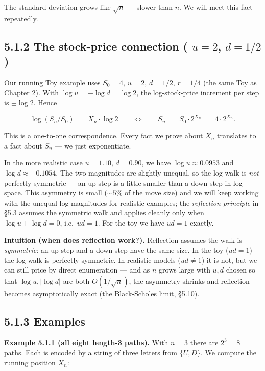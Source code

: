 \documentclass[
  10pt,
  twoside]{book}
\begin{document}
The standard deviation grows like \(\sqrt n\) --- slower than \(n\). We
will meet this fact repeatedly.

\subsection{\texorpdfstring{5.1.2 The stock-price connection (
\(u = 2\),
\(d = 1/2\))}{5.1.2 The stock-price connection ( u = 2, d = 1/2)}}\label{the-stock-price-connection-u-2-d-12}

Our running Toy example uses \(S_0 = 4\), \(u = 2\), \(d = 1/2\),
\(r = 1/4\) (the same Toy as Chapter 2). With
\(\log u = -\log d = \log 2\), the log-stock-price increment per step is
\(\pm \log 2\). Hence

\[\log(S_n / S_0) \;=\; X_n \cdot \log 2 \qquad \Longleftrightarrow \qquad S_n \;=\; S_0 \cdot 2^{X_n} \;=\; 4 \cdot 2^{X_n}.\]

This is a one-to-one correspondence. Every fact we prove about \(X_n\)
translates to a fact about \(S_n\) --- we just exponentiate.

In the more realistic case \(u = 1.10\), \(d = 0.90\), we have
\(\log u \approx 0.0953\) and \(\log d \approx -0.1054\). The two
magnitudes are slightly unequal, so the log walk is \emph{not} perfectly
symmetric --- an up-step is a little smaller than a down-step in log
space. This asymmetry is small (\(\sim 5\%\) of the move size) and we
will keep working with the unequal log magnitudes for realistic
examples; the \emph{reflection principle} in §5.3 assumes the symmetric
walk and applies cleanly only when \(\log u + \log d = 0\),
i.e.~\(ud = 1\). For the toy we have \(ud = 1\) exactly.

\textbf{Intuition (when does reflection work?).} Reflection assumes the
walk is \emph{symmetric}: an up-step and a down-step have the same size.
In the toy (\(ud = 1\)) the log walk is perfectly symmetric. In
realistic models (\(ud \ne 1\)) it is not, but we can still price by
direct enumeration --- and as \(n\) grows large with \(u, d\) chosen so
that \(\log u, |\log d|\) are both \(O(1/\sqrt n)\), the asymmetry
shrinks and reflection becomes asymptotically exact (the Black-Scholes
limit, §5.10).

\subsection{5.1.3 Examples}\label{examples-23}

\textbf{Example 5.1.1 (all eight length-3 paths).} With \(n = 3\) there
are \(2^3 = 8\) paths. Each is encoded by a string of three letters from
\(\{U, D\}\). We compute the running position \(X_n\):
\end{document}
